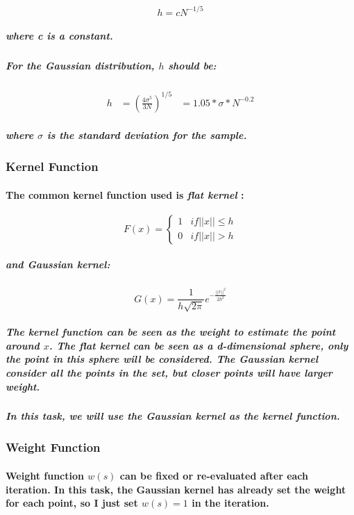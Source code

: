 \documentclass{article}
\begin{document}
\begin{equation}
    h = cN^{-1/5}
\end{equation}
\subparagraph{
    where c is a constant.
}
\subparagraph{
    For the Gaussian distribution, $h$ should be:
}

\begin{equation}
\begin{aligned}
    h &= (\frac{4\sigma^5}{3N})^{1/5}
&=1.05 * \sigma * N^{-0.2}
\end{aligned}
\end{equation}
\subparagraph{where $\sigma$ is the standard deviation for the sample.}

\subsubsection{Kernel Function}
\paragraph{
    The common kernel function used is \textit{flat kernel} :
}

\begin{equation}
    F(x) =
    \begin{cases}
        1 &if ||x|| \le h\\
        0 &if ||x|| > h
        \end{cases}
\end{equation}
\subparagraph{and \textit{Gaussian kernel}:}

\begin{equation}
    G(x) = \frac{1}{h\sqrt{2\pi}} e^{-\frac{||x||^2}{2h^2}}
\end{equation}

\subparagraph{
    The kernel function can be seen as the weight to estimate the point around $x$.
    The \textit{flat kernel} can be seen as a d-dimensional sphere, only the point in this sphere will be considered.
    The \textit{Gaussian kernel} consider all the points in the set, but closer points will have larger weight.
}
\subparagraph{
    In this task, we will use the \textit{Gaussian kernel} as the kernel function.
}

\subsubsection{Weight Function}
\paragraph{
    Weight function $w(s)$ can be fixed or re-evaluated after each iteration. In this task, the Gaussian kernel has already
    set the weight for each point, so I just set $w(s) = 1$ in the iteration.
}
\end{document}
